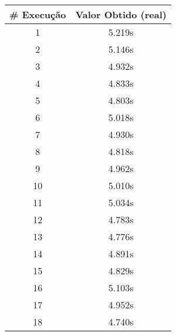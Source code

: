 \documentclass[11pt]{article}
\begin{document}
\begin{table}[!h]
\begin{center}
\begin{minipage}{0.48\textwidth}
\begin{tabular}{| c | c |}
			\hline
				\textbf{\# Execução} &  \textbf{Valor Obtido (real)} \\ \hline
				1 & 5.219s \\ \hline
				2 & 5.146s \\ \hline
				3 & 4.932s \\ \hline
				4 & 4.833s \\ \hline
				5 & 4.803s \\ \hline
				6 & 5.018s \\ \hline
				7 & 4.930s \\ \hline
				8 & 4.818s \\ \hline
				9 & 4.962s \\ \hline
				10 & 5.010s \\ \hline
				11 & 5.034s \\ \hline
				12 & 4.783s \\ \hline
				13 & 4.776s \\ \hline
				14 & 4.891s \\ \hline
				15 & 4.829s \\ \hline
				16 & 5.103s \\ \hline
				17 & 4.952s \\ \hline
				18 & 4.740s \\ \hline
			\end{tabular}
		\end{minipage}
	\end{center}
\end{table}
\end{document}
